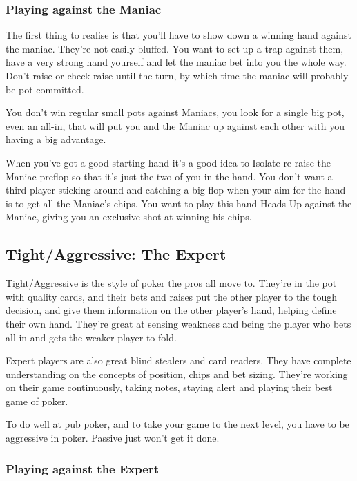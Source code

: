 \subsubsection{Playing against the Maniac}

The first thing to realise is that you'll have to show down a winning
hand against the maniac. They're not easily bluffed. You want to set up a
trap against them, have a very strong hand yourself and let the maniac
bet into you the whole way. Don't raise or check raise until
the turn, by which time the maniac will probably be pot committed.

You don't win regular small pots against Maniacs, you look for a single big
pot, even an all-in, that will put you and the Maniac up against each
other with you having a big advantage.

When you've got a good starting hand it's a good idea to Isolate
re-raise the
Maniac preflop so that it's just the two of you in the hand. You don't
want a third player sticking around and catching a big flop when your
aim for the hand is to get all the Maniac's chips.
You want to play this hand Heads Up against the Maniac,
giving you an exclusive shot at winning his chips.

\subsection{Tight/Aggressive: The Expert}

Tight/Aggressive is the style of poker the pros all move to. They're
in the pot with quality cards, and their bets and raises put the
other player to the tough decision, and give them information on
the other player's hand, helping define their own hand. They're great
at sensing weakness and being the player who bets all-in and gets
the weaker player to fold. 

Expert players are also great blind stealers and card readers. 
They have complete understanding on
the concepts of position, chips and bet sizing. They're working on
their game continuously, taking notes, staying alert and playing
their best game of poker.

To do well at pub poker, and to take your game to the next level,
you have to be aggressive in poker. Passive just won't get it done.

\subsubsection{Playing against the Expert}

